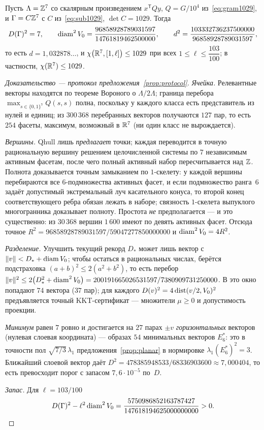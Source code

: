 \begin{keybox}
\begin{theorem}\label{thm:r7ex}
Пусть $\Lambda=\mathbb{Z}^7$ со скалярным произведением $x^{\mathsf T}Qy$,
$Q=G/10^4$ из~\eqref{eq:gram1029}, и $\Gamma=C\mathbb{Z}^7$ с $C$
из~\eqref{eq:sub1029}, $\det C=1029$. Тогда
\[
D(\Gamma)^2=7,\qquad
\operatorname{diam}^2 V_0=\frac{96858928789031597}{14761819462500000},\qquad
d^2=\frac{103332736237500000}{96858928789031597},
\]
то есть $d=1{,}032878\ldots$, и $\chi\bigl(\mathbb{R}^7,[1,\ell]\bigr)\le1029$ при
всех $1\le\ell\le\dfrac{103}{100}$; в частности, $\chi(\mathbb{R}^7)\le1029$.
\end{theorem}
\end{keybox}

\begin{proof}[Доказательство --- протокол предложения~\ref{prop:protocol}]
\emph{Ячейка.} Релевантные векторы находятся по теореме Вороного о
$\Lambda/2\Lambda$; граница перебора $\max_{s\in\{0,1\}^7}Q(s,s)$ полна,
поскольку у каждого класса есть представитель из нулей и единиц; из
$300\,368$ перебранных векторов получаются $127$ пар, то есть $254$ фасеты,
максимум, возможный в $\mathbb{R}^7$ (ни один класс не вырождается).

\emph{Вершины.} Qhull лишь \emph{предлагает} точки; каждая переводится в
точную рациональную вершину решением целочисленной системы по $7$
независимым активным фасетам, после чего полный активный набор
пересчитывается над $\mathbb{Z}$. Полнота доказывается точным замыканием по
$1$-скелету: у каждой вершины перебираются все $6$-подмножества активных
фасет, и если подмножество ранга~$6$ задаёт допустимый экстремальный луч
касательного конуса, то второй конец соответствующего ребра обязан лежать в
наборе; связность $1$-скелета выпуклого многогранника доказывает полноту.
Простота \emph{не} предполагается --- и это существенно: из $30\,368$ вершин
$1\,600$ имеют по девять активных фасет. Отсюда точное
$R^2=96858928789031597/59047277850000000$ и $\operatorname{diam}^2V_0=4R^2$.

\emph{Разделение.} Улучшить текущий рекорд $D_*$ может лишь вектор с
$\|v\|<D_{*}+\operatorname{diam} V_0$; чтобы остаться в рациональных числах, берётся
подстраховка $(a+b)^2\le2(a^2+b^2)$, то есть перебор
$\|v\|^2\le2\bigl(D_{*}^2+\operatorname{diam}^2 V_0\bigr)=
200191665026531597/7380909731250000$. В это окно попадают $74$ вектора
($37$ пар); для каждого $D(v)^2=4\operatorname{dist}(v/2,V_0)^2$ предъявляется точный
KKT-сертификат --- множители $\mu\ge0$ и допустимость проекции.

\emph{Минимум} равен $7$ ровно и достигается на $27$ парах $\pm v$
\emph{горизонтальных} векторов (нулевая слоевая координата) --- образах
$54$ минимальных векторов $E_6^*$: это в точности пол
$\sqrt{7/3}\,\lambda_1$ предложения~\ref{prop:planar} в нормировке
$\lambda_1(E_6^*)^2=3$. Ближайший слоевой вектор даёт
$D^2=478385948533/68336903600\approx7{,}000404$, то есть превосходит порог с
запасом $7{,}6\cdot10^{-5}$ по~$D$.

\emph{Запас.} Для $\ell=103/100$
\[
D(\Gamma)^2-\ell^2\operatorname{diam}^2 V_0
=\frac{5750986852163787427}{147618194625000000000}>0 .
\qedhere
\]
\end{proof}

